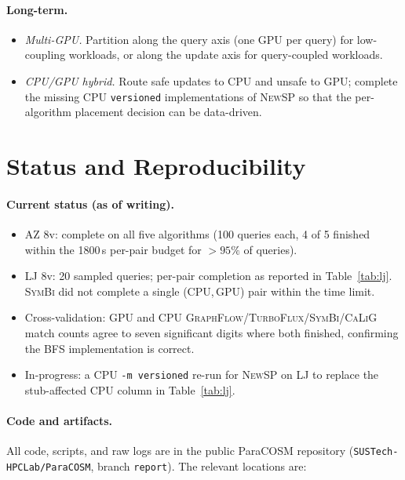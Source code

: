 \documentclass[sigconf,nonacm]{acmart}
\theoremstyle{definition}
\begin{document}
\paragraph{Long-term.}
\begin{itemize}
  \item \emph{Multi-GPU.} Partition along the query axis (one GPU per query) for low-coupling workloads, or along the update axis for query-coupled workloads.
  \item \emph{CPU/GPU hybrid.} Route safe updates to CPU and unsafe to GPU; complete the missing CPU \texttt{versioned} implementations of \textsc{NewSP} so that the per-algorithm placement decision can be data-driven.
\end{itemize}

\section{Status and Reproducibility}
\label{sec:status}

\paragraph{Current status (as of writing).}
\begin{itemize}
  \item AZ 8v: complete on all five algorithms (100 queries each, 4 of 5 finished within the 1800\,s per-pair budget for $>95\%$ of queries).
  \item LJ 8v: 20 sampled queries; per-pair completion as reported in Table~\ref{tab:lj}. \textsc{SymBi} did not complete a single (CPU,\,GPU) pair within the time limit.
  \item Cross-validation: GPU and CPU \textsc{GraphFlow}/\textsc{TurboFlux}/\textsc{SymBi}/\textsc{CaLiG} match counts agree to seven significant digits where both finished, confirming the BFS implementation is correct.
  \item In-progress: a CPU \texttt{-m versioned} re-run for \textsc{NewSP} on LJ to replace the stub-affected CPU column in Table~\ref{tab:lj}.
\end{itemize}

\paragraph{Code and artifacts.}
All code, scripts, and raw logs are in the public ParaCOSM repository (\texttt{SUSTech-HPCLab/ParaCOSM}, branch \texttt{report}). The relevant locations are:
\end{document}
